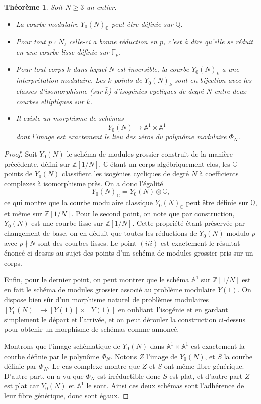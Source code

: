 \documentclass[11pt,a4paper]{article}
\newcommand{\Z}{\mathbb{Z}}
\newcommand{\C}{\mathbb{C}}
\newcommand{\A}{\mathbb{A}}
\newcommand{\F}{\mathbb{F}}
\newcommand{\Q}{\mathbb{Q}}
\newcommand{\vers}{\longrightarrow}
\renewcommand{\v}{\vspace{5mm}}
\newtheorem*{thm}{Théorème}
\theoremstyle{definition}
\begin{document}
\begin{thm} Soit $N\geq 3$ un entier.

\begin{itemize}

\item[(i)] La courbe modulaire $Y_0(N)_\C$ peut être définie sur $\Q$.
\item[(ii)] Pour tout $p \nmid N$, celle-ci a bonne réduction en $p$, c'est à dire qu'elle se réduit en une courbe lisse définie sur $\F_p$.
\item[(iii)] Pour tout corps $k$ dans lequel $N$ est inversible, la courbe $Y_0(N)_k$ a une interprétation modulaire. Les $k$-points de $Y_0(N)_k$ sont en bijection avec les classes d'isomorphisme (sur $\bar{k}$) d'isogénies cycliques de degré $N$ entre deux courbes elliptiques sur $k$.
\item[(iv)] Il existe un morphisme de schémas
$$Y_0(N) \vers \A^1\times \A^1$$
dont l'image est exactement le lieu des zéros du polynôme modulaire $\Phi_N$. 

\end{itemize}

\end{thm}

\begin{proof}
Soit $Y_0(N)$ le schéma de modules grossier construit de la manière précédente, défini sur $\Z[1/N]$. $\C$ étant un corps algébriquement clos, les $\C$-points de $Y_0(N)$ classifient les isogénies cycliques de degré $N$ à coefficients complexes à isomorphisme près. On a donc l'égalité
$$Y_0(N)_\C = Y_0(N) \otimes \C,$$
ce qui montre que la courbe modulaire classique $Y_0(N)_\C$ peut être définie sur $\Q$, et même sur $\Z[1/N]$. Pour le second point, on note que par construction, $Y_0(N)$ est une courbe lisse sur $\Z[1/N]$. Cette propriété étant préservée par changement de base, on en déduit que toutes les réductions de $Y_0(N)$ modulo $p$ avec $p \nmid N$ sont des courbes lisses. Le point $(iii)$ est exactement le résultat énoncé ci-dessus au sujet des points d'un schéma de modules grossier pris sur un corps.

Enfin, pour le dernier point, on peut montrer que le schéma $\A^1$ sur $\Z[1/N]$ est en fait le schéma de modules grossier associé au problème modulaire $Y(1)$. On dispose bien sûr d'un morphisme naturel de problèmes modulaires $[Y_0(N)] \vers [Y(1)]\times [Y(1)]$ en \og oubliant\fg\ l'isogénie et en gardant simplement le départ et l'arrivée, et on peut dérouler la construction ci-dessus pour obtenir un morphisme de schémas comme annoncé.

Montrons que l'image schématique de $Y_0(N)$ dans $\A^1\times \A^1$ est exactement la courbe définie par le polynôme $\Phi_N$. Notons $Z$ l'image de $Y_0(N)$, et $S$ la courbe définie par $\Phi_N$. Le cas complexe montre que $Z$ et $S$ ont même fibre générique. D'autre part, on a vu que $\Phi_N$ est irréductible donc $S$ est plat, et d'autre part $Z$ est plat car $Y_0(N)$ et $\A^1$ le sont. Ainsi ces deux schémas sont l'adhérence de leur fibre générique, donc sont égaux.
\end{proof}
\v
\end{document}
